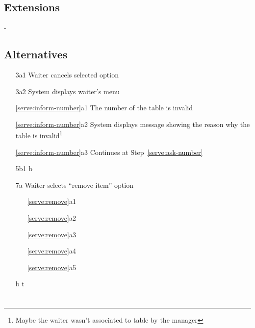\documentclass[a4paper,11pt,oneside]{book}
\makeatletter
\newcommand{\cancel}[1]{#1 cancels selected option}
\newcommand{\menu}[1]{System displays #1's menu}
\newcommand{\goto}[1]{Continues at Step~\ref{#1}}
\newcommand{\customlabel}[2]{#2\def\@currentlabel{#2}\label{#1}}
\makeatother
\begin{document}
\section{Extensions}

-

\section{Alternatives}

\begin{enumerate}
  \item [3a1] \cancel{Waiter}
  \item [3a2] \menu{waiter}
    \\
  \item [\ref{serve:inform-number}a1] The number of the table is invalid
  \item [\ref{serve:inform-number}a2] System displays message showing the reason why the table is invalid\footnote{Maybe the waiter wasn't associated to table by the manager}
  \item [\ref{serve:inform-number}a3] \goto{serve:ask-number}
    \\
  \item [5b1] b
    \\
  \item [\customlabel{serve:remove}{7a}]Waiter selects ``remove item'' option
    \begin{enumerate}
      \item [\ref{serve:remove}a1]
      \item [\ref{serve:remove}a2]
      \item [\ref{serve:remove}a3]
      \item [\ref{serve:remove}a4]
      \item [\customlabel{serve:exclude}{\ref{serve:remove}a5}]
    \end{enumerate}

  \item [b] t
\end{enumerate}


\iffalse

\chapter{}
\end{document}
